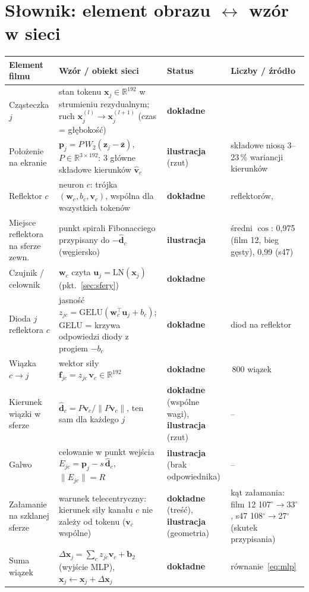\documentclass[a4paper,11pt]{article}
\newcommand{\DOK}{\textcolor{dok}{\textbf{dokładne}}}
\newcommand{\ILU}{\textcolor{ilu}{\textbf{ilustracja}}}
\newcommand{\LN}{\mathrm{LN}}
\newcommand{\GELU}{\mathrm{GELU}}
\begin{document}
\section{Słownik: element obrazu $\leftrightarrow$ wzór w sieci}
\begin{longtable}{>{\raggedright\arraybackslash}p{3.1cm}>{\raggedright\arraybackslash}p{5.9cm}>{\raggedright\arraybackslash}p{2.4cm}>{\raggedright\arraybackslash}p{3.6cm}}
\toprule
\textbf{Element filmu} & \textbf{Wzór / obiekt sieci} & \textbf{Status} & \textbf{Liczby / źródło}\\\midrule\endhead
Cząsteczka $j$ & stan tokenu $\bm x_j\in\mathbb R^{192}$ w strumieniu rezydualnym; ruch $\bm x_j^{(l)}\to\bm x_j^{(l+1)}$ (czas = głębokość) & \DOK & \cite{lu19,ges23}\\
Położenie na ekranie & $\bm p_j=P\,W_2(\bm z_j-\bar{\bm z})$, $P\in\mathbb R^{3\times192}$: 3 główne składowe kierunków $\hat{\bm v}_c$ & \ILU{} (rzut) & 3 składowe niosą 3--23\,\% wariancji kierunków\\
Reflektor $c$ & neuron $c$: trójka $(\bm w_c,b_c,\bm v_c)$, wspólna dla wszystkich tokenów & \DOK & 768 reflektorów, \cite{geva21}\\
Miejsce reflektora na sferze zewn. & punkt spirali Fibonacciego przypisany do $-\hat{\bm d}_c$ (węgiersko) & \ILU & średni $\cos$: 0{,}975 (film 12, bieg gęsty), 0{,}99 (s47)\\
Czujnik / celownik & $\bm w_c$ czyta $\bm u_j=\LN(\bm x_j)$ (pkt.~\ref{sec:sfery}) & \DOK & \cite{riechers24}\\
Dioda $j$ reflektora $c$ & jasność $z_{jc}=\GELU(\bm w_c^{\!\top}\bm u_j+b_c)$; GELU = krzywa odpowiedzi diody z progiem $-b_c$ & \DOK & 600 diod na reflektor\\
Wiązka $c\to j$ & wektor siły $\bm f_{jc}=z_{jc}\,\bm v_c\in\mathbb R^{192}$ & \DOK & 460\,800 wiązek\\
Kierunek wiązki w sferze & $\hat{\bm d}_c=P\bm v_c/\lVert P\bm v_c\rVert$, ten sam dla każdego $j$ & \DOK{} (wspólne wagi), \ILU{} (rzut) & --\\
Galwo & celowanie w punkt wejścia $E_{jc}=\bm p_j-s\,\hat{\bm d}_c$, $\lVert E_{jc}\rVert=R$ & \ILU{} (brak odpowiednika) & --\\
Załamanie na szklanej sferze & warunek telecentryczny: kierunek siły kanału $c$ nie zależy od tokenu ($\bm v_c$ wspólne) & \DOK{} (treść), \ILU{} (geometria) & kąt załamania: film 12 107$^\circ\to$33$^\circ$, s47 108$^\circ\to$27$^\circ$ (skutek przypisania)\\
Suma wiązek & $\Delta\bm x_j=\sum_c z_{jc}\bm v_c+\bm b_2$ (wyjście MLP), $\bm x_j\leftarrow\bm x_j+\Delta\bm x_j$ & \DOK & równanie~\eqref{eq:mlp}\\

\end{longtable}
\end{document}

